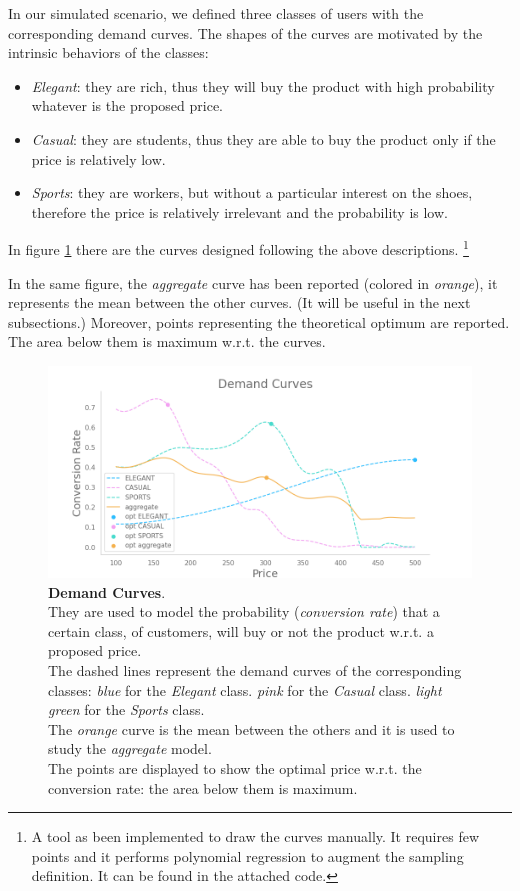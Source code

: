 In our simulated scenario, we defined three classes of users with the corresponding demand curves. The shapes of the curves are motivated by the intrinsic behaviors of the classes:
\begin{itemize}
    \item \textit{Elegant}: they are rich, thus they will buy the product with high probability whatever is the proposed price.
    \item \textit{Casual}: they are students, thus they are able to buy the product only if the price is relatively low.
    \item \textit{Sports}: they are workers, but without a particular interest on the shoes, therefore the price is relatively irrelevant and the probability is low.
\end{itemize}

In figure \ref{demandCurvesFig} there are the curves designed following the above descriptions.
\footnote{A tool as been implemented to draw the curves manually. It requires few points and it performs polynomial regression to augment the sampling definition. It can be found in the attached code.}

In the same figure, the \textit{aggregate} curve has been reported (colored in \textit{orange}), it represents the mean between the other curves. (It will be useful in the next subsections.)
Moreover, points representing the theoretical optimum are reported. The area below them is maximum w.r.t. the curves.

\begin{figure}[H]
    \centering

    \includegraphics[width=1.0\textwidth]{images/demand_curves.png}
    \caption{\textbf{Demand Curves}.\\
    They are used to model the probability (\textit{conversion rate}) that a certain class, of customers, will buy or not the product w.r.t. a proposed price.\\
    The dashed lines represent the demand curves of the corresponding classes:
    \textit{blue} for the \textit{Elegant} class.
    \textit{pink} for the \textit{Casual} class.
    \textit{light green} for the \textit{Sports} class.\\
    The \textit{orange} curve is the mean between the others and it is used to study the \textit{aggregate} model.\\
    The points are displayed to show the optimal price w.r.t. the conversion rate: the area below them is maximum.}
    \label{demandCurvesFig}
\end{figure}


